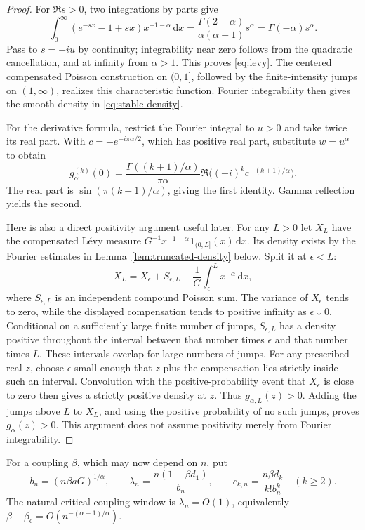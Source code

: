 \documentclass[11pt,a4paper]{article}
\numberwithin{equation}{section}
\theoremstyle{definition}
\theoremstyle{remark}
\newcommand{\dd}{\,\mathrm d}
\newcommand{\bc}{\beta_{\mathrm c}}
\begin{document}
\begin{proof}
For $\Re s>0$, two integrations by parts give
\[
 \int_0^\infty(e^{-sx}-1+sx)x^{-1-\alpha}\dd x
 =\frac{\Gamma(2-\alpha)}{\alpha(\alpha-1)}s^\alpha
 =\Gamma(-\alpha)s^\alpha.
\]
Pass to $s=-iu$ by continuity; integrability near zero follows from the
quadratic cancellation, and at infinity from $\alpha>1$. This proves
\eqref{eq:levy}. The centered compensated Poisson construction on
$(0,1]$, followed by the finite-intensity jumps on $(1,\infty)$, realizes
this characteristic function. Fourier integrability then gives the
smooth density in \eqref{eq:stable-density}.

For the derivative formula, restrict the Fourier integral to $u>0$ and
take twice its real part. With $c=-e^{-i\pi\alpha/2}$, which has positive
real part, substitute $w=u^\alpha$ to obtain
\[
 g_\alpha^{(k)}(0)=\frac{\Gamma((k+1)/\alpha)}{\pi\alpha}
       \Re\bigl((-i)^k c^{-(k+1)/\alpha}\bigr).
\]
The real part is $\sin(\pi(k+1)/\alpha)$, giving the first identity.
Gamma reflection yields the second.

Here is also a direct positivity argument useful later. For any $L>0$
let $X_L$ have the compensated L\'evy measure
$G^{-1}x^{-1-\alpha}\mathbf1_{(0,L]}(x)\dd x$.
Its density exists by the Fourier estimates in
Lemma~\ref{lem:truncated-density} below. Split it at $\epsilon<L$:
\[
 X_L=X_\epsilon+S_{\epsilon,L}
                  -\frac1G\int_\epsilon^L x^{-\alpha}\dd x,
\]
where $S_{\epsilon,L}$ is an independent compound Poisson sum.
The variance of $X_\epsilon$ tends to zero, while the displayed
compensation tends to positive infinity as $\epsilon\downarrow0$.
Conditional on a sufficiently large finite number of jumps,
$S_{\epsilon,L}$ has a density positive throughout the interval between
that number times $\epsilon$ and that number times $L$. These intervals
overlap for large numbers of jumps. For any prescribed real $z$, choose
$\epsilon$ small enough that $z$ plus the compensation lies strictly
inside such an interval. Convolution with the positive-probability event
that $X_\epsilon$ is close to zero then gives a strictly positive density
at $z$. Thus $g_{\alpha,L}(z)>0$. Adding the jumps above $L$ to $X_L$,
and using the positive probability of no such jumps, proves
$g_\alpha(z)>0$. This argument does not assume positivity merely from
Fourier integrability.
\end{proof}

For a coupling $\beta$, which may now depend on $n$, put
\begin{equation}\label{eq:bn-lambda}
 b_n=(n\beta aG)^{1/\alpha},\qquad
 \lambda_n=\frac{n(1-\beta d_1)}{b_n},\qquad
 c_{k,n}=\frac{n\beta d_k}{k!b_n^k}\quad(k\ge2).
\end{equation}
The natural critical coupling window is $\lambda_n=O(1)$, equivalently
$\beta-\bc=O(n^{-(\alpha-1)/\alpha})$.
\end{document}
